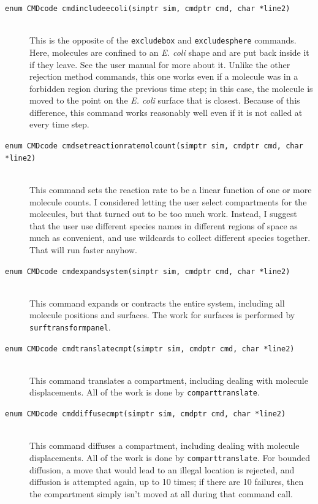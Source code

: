\documentclass {scrbook}
\newcommand {\ttt} {\texttt}
\begin{document}
\begin{description}
\item[\ttt{enum CMDcode cmdincludeecoli(simptr sim, cmdptr cmd, char *line2)}]
\hfill \\
This is the opposite of the \ttt{excludebox} and \ttt{excludesphere} commands. Here, molecules are confined to an \emph{E. coli} shape and are put back inside it if they leave. See the user manual for more about it. Unlike the other rejection method commands, this one works even if a molecule was in a forbidden region during the previous time step; in this case, the molecule is moved to the point on the \emph{E. coli} surface that is closest. Because of this difference, this command works reasonably well even if it is not called at every time step.

\item[\ttt{enum CMDcode cmdsetreactionratemolcount(simptr sim, cmdptr cmd, char *line2)}]
\hfill \\
This command sets the reaction rate to be a linear function of one or more molecule counts. I considered letting the user select compartments for the molecules, but that turned out to be too much work. Instead, I suggest that the user use different species names in different regions of space as much as convenient, and use wildcards to collect different species together. That will run faster anyhow.

\item[\ttt{enum CMDcode cmdexpandsystem(simptr sim, cmdptr cmd, char *line2)}]
\hfill \\
This command expands or contracts the entire system, including all molecule positions and surfaces. The work for surfaces is performed by \ttt{surftransformpanel}.

\item[\ttt{enum CMDcode cmdtranslatecmpt(simptr sim, cmdptr cmd, char *line2)}]
\hfill \\
This command translates a compartment, including dealing with molecule displacements. All of the work is done by \ttt{comparttranslate}.

\item[\ttt{enum CMDcode cmddiffusecmpt(simptr sim, cmdptr cmd, char *line2)}]
\hfill \\
This command diffuses a compartment, including dealing with molecule displacements. All of the work is done by \ttt{comparttranslate}. For bounded diffusion, a move that would lead to an illegal location is rejected, and diffusion is attempted again, up to 10 times; if there are 10 failures, then the compartment simply isn't moved at all during that command call.


\end{description}
\end{document}
